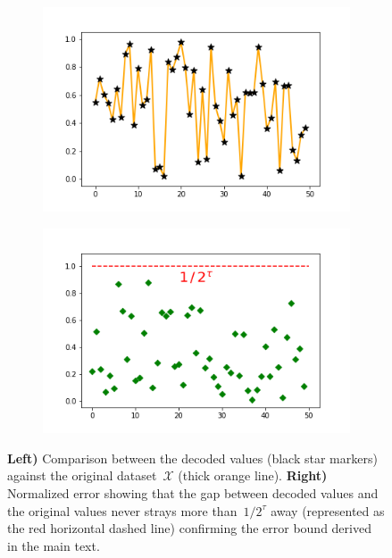 \documentclass{article}
\begin{document}
\begin{figure}[hb!]
\centering
\begin{subfigure}{.5\textwidth}
\centering
\includegraphics[width=\linewidth]{resources/codeExamples/decodedValues_dyadic.png}
\end{subfigure}%
\begin{subfigure}{.5\textwidth}
\centering
\includegraphics[width=\linewidth]{resources/codeExamples/normalizedError_dyadic.png}
\end{subfigure}
\caption{{\bf Left)} Comparison between the decoded values (black star markers) against the original dataset~$\mathcal{X}$ (thick orange line). {\bf Right)} Normalized error showing that the gap between decoded values and the original values never strays more than~$1/2^\tau$ away (represented as the red horizontal dashed line) confirming the error bound derived in the main text.}
\label{fig:naivePics}
\end{figure}
\end{document}
